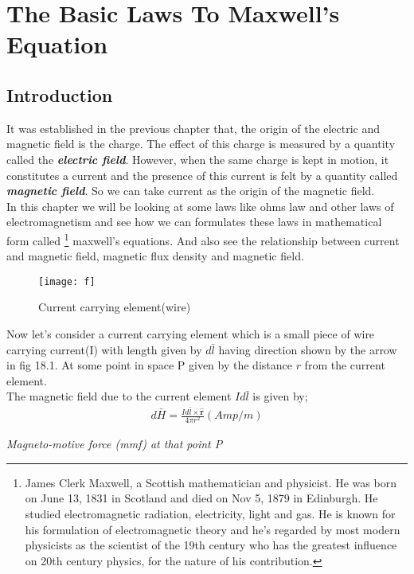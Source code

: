 \chapter{The Basic Laws To Maxwell's Equation}
	\section{Introduction}
	It was established in the previous chapter that, the origin of the electric and magnetic field is the charge. The effect of this charge is measured by a quantity called the \textbf{\emph{electric field}}. However, when the same charge is kept in motion, it constitutes a current and the presence of this current is felt by a quantity called \textbf{\emph{magnetic field}}. So we can take current as the origin of the magnetic field. \\
	
	In this chapter we will be looking at some laws like ohms law and other laws of electromagnetism and see how we can formulates these laws in mathematical form called \footnote[1]{James Clerk Maxwell, a Scottish mathematician and physicist. He was born on June 13, 1831 in Scotland and died on Nov 5, 1879 in Edinburgh. He studied electromagnetic radiation, electricity, light and gas. He is known for his formulation of electromagnetic theory and he's regarded by most modern physicists as the scientist of the 19th century who has the greatest influence on 20th century physics, for the nature of his contribution.} maxwell's equations. And also see the relationship between current and magnetic field, magnetic flux density and magnetic field.\\
	\begin{figure}
		\centering
		\texttt{[image: f]}
		\caption{Current carrying element(wire)}
		\label{}
	\end{figure}
	

Now let's consider a current carrying element which is a small piece of wire carrying current(I) with length given by $d\bar{l}$ having direction shown by the arrow in fig 18.1. At some point in space P given by the  distance $r$ from the current element.\\


The magnetic field due to the current element $Id\bar{l}$ is given by; \\
\begin{align}
\boxed{d\bar{H}= \frac{Id\bar{l} \times \hat{\textbf{r}}}{4\pi r^{2}}} (Amp/m)
\end{align} 
\begin{center}
	\emph{Magneto-motive force (mmf) at that point P} 
\end{center}



